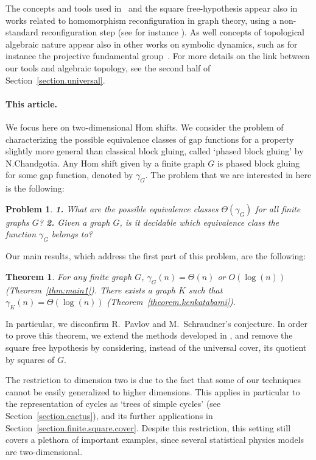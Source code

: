 \documentclass{article}
\newtheorem*{theorem*}{Theorem}
\newtheorem*{problem*}{Problem}
\begin{document}
The concepts and tools used in~\cite{CM18} and the square free-hypothesis appear also in works related to homomorphism reconfiguration in graph theory, using a non-standard reconfiguration step (see for instance \cite{W20}). As well concepts of topological algebraic nature appear also in other works on symbolic dynamics, such as for instance the projective fundamental group~\cite{GP95}. For more details on the link between our tools and algebraic topology, see the second half of Section~\ref{section.universal}.

\paragraph*{This article.} We focus here on two-dimensional Hom shifts. We consider the problem of characterizing the possible equivalence classes of gap functions for a property 
slightly more general than classical block gluing, called `phased block gluing' by N.Chandgotia. 
Any Hom shift given by a finite graph $G$ is phased block gluing for some gap function, %
denoted by $\gamma_G$. The problem that we are interested in here is the following: 

\begin{problem*}
\textbf{1.} What are the possible equivalence classes $\Theta(\gamma_G)$ for all finite graphs $G$? \textbf{2.} Given a graph $G$, is it decidable which equivalence class the function $\gamma_G$ belongs to?\end{problem*}

Our main results, which address the first part of this problem, are the following:
\begin{theorem*}
For any finite graph $G$, $\gamma_G(n) = \Theta(n)$ or $O(\log(n))$ (Theorem~\ref{thm:main1}). There exists a graph $K$ such that $\gamma_K(n) = \Theta(\log(n))$ (Theorem~\ref{theorem.kenkatabami}).
\end{theorem*}

In particular, we disconfirm R.~Pavlov and M.~Schraudner's conjecture. In order to prove this theorem, we extend 
the methods developed in \cite{CM18}, and remove the 
square free hypothesis by considering, instead of the universal cover, its quotient by squares of $G$. 

The restriction to dimension two is due to the fact that some of our techniques cannot be easily generalized to higher dimensions. This applies in particular to the representation of cycles as `trees of simple cycles' (see Section~\ref{section.cactus}), and its further applications in Section~\ref{section.finite.square.cover}. Despite this restriction, this setting still covers a plethora of important examples, since several statistical physics models are two-dimensional.
\end{document}
